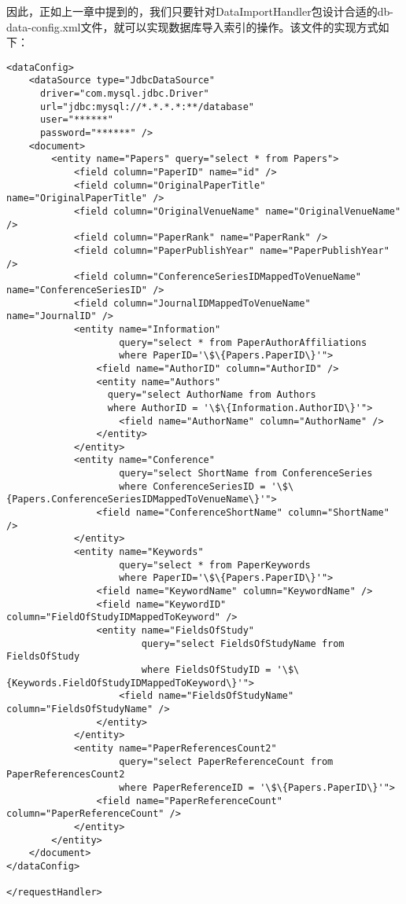 因此，正如上一章中提到的，我们只要针对DataImportHandler包设计合适的db-data-config.xml文件，就可以实现数据库导入索引的操作。该文件的实现方式如下：
\begin{lstlisting}[caption={从数据库中导入索引的db-data-config.xml}, label=dbtoindex, escapeinside="", numbers=none]
<dataConfig>
    <dataSource type="JdbcDataSource"
      driver="com.mysql.jdbc.Driver"
      url="jdbc:mysql://*.*.*.*:**/database"
      user="******"
      password="******" />
    <document>
        <entity name="Papers" query="select * from Papers">
            <field column="PaperID" name="id" />
            <field column="OriginalPaperTitle" name="OriginalPaperTitle" />
            <field column="OriginalVenueName" name="OriginalVenueName" />
            <field column="PaperRank" name="PaperRank" />
            <field column="PaperPublishYear" name="PaperPublishYear" />
            <field column="ConferenceSeriesIDMappedToVenueName" name="ConferenceSeriesID" />
            <field column="JournalIDMappedToVenueName" name="JournalID" />
            <entity name="Information"
                    query="select * from PaperAuthorAffiliations
                    where PaperID='\$\{Papers.PaperID\}'">
                <field name="AuthorID" column="AuthorID" />
                <entity name="Authors"
                  query="select AuthorName from Authors
                  where AuthorID = '\$\{Information.AuthorID\}'">
                    <field name="AuthorName" column="AuthorName" />
                </entity>
            </entity>
            <entity name="Conference"
                    query="select ShortName from ConferenceSeries
                    where ConferenceSeriesID = '\$\{Papers.ConferenceSeriesIDMappedToVenueName\}'">
                <field name="ConferenceShortName" column="ShortName" />
            </entity>
            <entity name="Keywords"
                    query="select * from PaperKeywords
                    where PaperID='\$\{Papers.PaperID\}'">
                <field name="KeywordName" column="KeywordName" />
                <field name="KeywordID" column="FieldOfStudyIDMappedToKeyword" />
                <entity name="FieldsOfStudy"
                        query="select FieldsOfStudyName from FieldsOfStudy
                        where FieldsOfStudyID = '\$\{Keywords.FieldOfStudyIDMappedToKeyword\}'">
                    <field name="FieldsOfStudyName" column="FieldsOfStudyName" />
                </entity>
            </entity>
            <entity name="PaperReferencesCount2"
                    query="select PaperReferenceCount from PaperReferencesCount2
                    where PaperReferenceID = '\$\{Papers.PaperID\}'">
                <field name="PaperReferenceCount" column="PaperReferenceCount" />
            </entity>
        </entity>
    </document>
</dataConfig>

</requestHandler>
\end{lstlisting}

